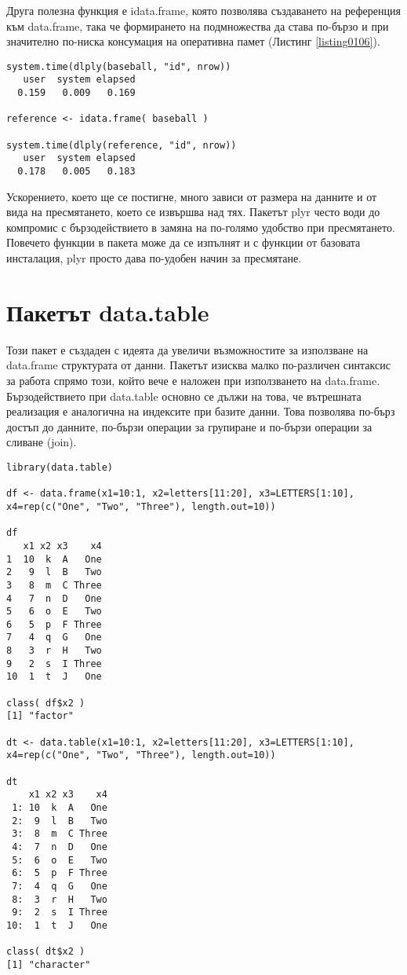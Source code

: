 Друга полезна функция е idata.frame, която позволява създаването на референция към data.frame, така че формирането на подмножества да става по-бързо и при значително по-ниска консумация на оперативна памет (Листинг \ref{listing0106}). 

\begin{lstlisting}[caption=Бързодействие при използване на референции, label=listing0106]
system.time(dlply(baseball, "id", nrow))
   user  system elapsed 
  0.159   0.009   0.169 

reference <- idata.frame( baseball )

system.time(dlply(reference, "id", nrow))
   user  system elapsed 
  0.178   0.005   0.183
\end{lstlisting}

Ускорението, което ще се постигне, много зависи от размера на данните и от вида на пресмятането, което се извършва над тях. Пакетът plyr често води до компромис с бързодействието в замяна на по-голямо удобство при пресмятането. Повечето функции в пакета може да се изпълнят и с функции от базовата инсталация, plyr просто дава по-удобен начин за пресмятане.

\section{Пакетът data.table}

Този пакет е създаден с идеята да увеличи възможностите за използване на data.frame структурата от данни. Пакетът изисква малко по-различен синтаксис за работа спрямо този, който вече е наложен при използването на data.frame. Бързодействието при data.table основно се дължи на това, че вътрешната реализация е аналогична на индексите при базите данни. Това позволява по-бърз достъп до данните, по-бързи операции за групиране и по-бързи операции за сливане (join).

\begin{lstlisting}[caption=Създаване на data.table, label=listing0107]
library(data.table)

df <- data.frame(x1=10:1, x2=letters[11:20], x3=LETTERS[1:10], x4=rep(c("One", "Two", "Three"), length.out=10))
 
df
   x1 x2 x3    x4
1  10  k  A   One
2   9  l  B   Two
3   8  m  C Three
4   7  n  D   One
5   6  o  E   Two
6   5  p  F Three
7   4  q  G   One
8   3  r  H   Two
9   2  s  I Three
10  1  t  J   One

class( df$x2 )
[1] "factor"

dt <- data.table(x1=10:1, x2=letters[11:20], x3=LETTERS[1:10], x4=rep(c("One", "Two", "Three"), length.out=10))
 
dt
    x1 x2 x3    x4
 1: 10  k  A   One
 2:  9  l  B   Two
 3:  8  m  C Three
 4:  7  n  D   One
 5:  6  o  E   Two
 6:  5  p  F Three
 7:  4  q  G   One
 8:  3  r  H   Two
 9:  2  s  I Three
10:  1  t  J   One

class( dt$x2 )
[1] "character"
\end{lstlisting}

